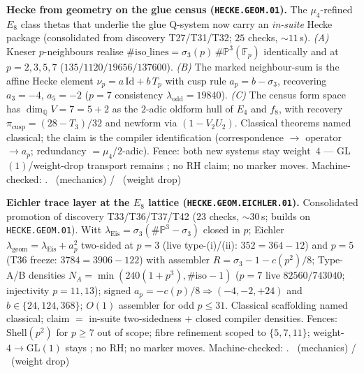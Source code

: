 \documentclass[11pt,a4paper]{article}
\begin{document}
\par\smallskip\noindent\textbf{Hecke from geometry on the glue census
(\texttt{HECKE.GEOM.01}).}
The $\mu_4$-refined $E_8$ class thetas that underlie the glue Q-system now carry an
\emph{in-suite} Hecke package (consolidated from discovery T27/T31/T32; $25$ checks,
$\sim11$\,s).
\emph{(A)} Kneser $p$-neighbours realise
$\#\mathrm{iso\_lines}=\sigma_3(p)\,\#\mathbb P^3(\mathbb F_p)$ identically and at
$p=2,3,5,7$ ($135/1120/19656/137600$).
\emph{(B)} The marked neighbour-sum is the affine Hecke element
$\nu_p=a\,\mathrm{Id}+b\,T_p$ with cusp rule $a_p=b-\sigma_3$, recovering
$a_3=-4$, $a_5=-2$ ($p=7$ consistency $\lambda_{\mathrm{odd}}=19840$).
\emph{(C)} The census form space has $\dim_{\mathbb Q}V=7=5{+}2$ as the $2$-adic oldform
hull of $E_4$ and $f_8$, with recovery $\pi_{\mathrm{cusp}}=(28-T_3)/32$ and newform via
$(1-V_2U_2)$. Classical theorems named classical; the claim is the compiler identification
(correspondence $\to$ operator $\to a_p$; redundancy $=\mu_4$/$2$-adic). Fence: both new
systems stay weight~$4$ --- GL$(1)$/weight-drop transport remains \mO; no RH claim; no
marker moves. Machine-checked: .
\mE\ (mechanics) / \mO\ (weight drop)

\par\smallskip\noindent\textbf{Eichler trace layer at the $E_8$ lattice
(\texttt{HECKE.GEOM.EICHLER.01}).}
Consolidated promotion of discovery T33/T36/T37/T42 ($23$ checks, $\sim30$\,s; builds on
\texttt{HECKE.GEOM.01}). Witt $\lambda_{\mathrm{Eis}}=\sigma_3(\#\mathbb P^3-\sigma_3)$ closed
in $p$; Eichler $\lambda_{\mathrm{geom}}=\lambda_{\mathrm{Eis}}+a_p^2$ two-sided at $p=3$
(live type-(i)/(ii): $352=364-12$) and $p=5$ (T36 freeze: $3784=3906-122$) with assembler
$R=\sigma_3-1-c(p^2)/8$; Type-A/B densities
$N_A=\min(240(1+p^3),\#\mathrm{iso}-1)$ ($p=7$ live $82560/743040$; injectivity $p=11,13$);
signed $a_p=-c(p)/8\Rightarrow(-4,-2,+24)$ and $b\in\{24,124,368\}$; $O(1)$ assembler for odd
$p\le31$. Classical scaffolding named classical; claim $=$ in-suite two-sidedness $+$ closed
compiler densities. Fences: $\mathrm{Shell}(p^2)$ for $p\ge7$ out of scope; fibre refinement
scoped to $\{5,7,11\}$; weight-$4\to$GL$(1)$ stays \mO; no RH; no marker moves.
Machine-checked: .
\mE\ (mechanics) / \mO\ (weight drop)
\end{document}
